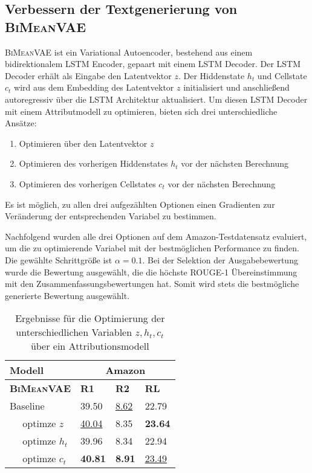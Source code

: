 \subsection{Verbessern der Textgenerierung von \textsc{BiMeanVAE}}
\textsc{BiMeanVAE} ist ein Variational Autoencoder, bestehend aus einem bidirektionalem LSTM Encoder, gepaart mit einem LSTM Decoder.
Der LSTM Decoder erhält als Eingabe den Latentvektor $z$. Der Hiddenstate $h_t$ und Cellstate $c_t$ wird aus dem Embedding des Latentvektor $z$ initialisiert und anschließend autoregressiv über die LSTM Architektur aktualisiert.
Um diesen LSTM Decoder mit einem Attributmodell zu optimieren, bieten sich drei unterschiedliche Ansätze:
\begin{enumerate}
    \item Optimieren über den Latentvektor $z$
    \item Optimieren des vorherigen Hiddenstates $h_t$ vor der nächsten Berechnung
    \item Optimieren des vorherigen Cellstates $c_t$ vor der nächsten Berechnung
\end{enumerate}

Es ist möglich, zu allen drei aufgezählten Optionen einen Gradienten zur Veränderung der entsprechenden Variabel zu bestimmen. 

Nachfolgend wurden alle drei Optionen auf dem Amazon-Testdatensatz evaluiert, um die zu optimierende Variabel mit der bestmöglichen Performance zu finden.
Die gewählte Schrittgröße ist $\alpha = 0.1$.
Bei der Selektion der Ausgabebewertung wurde die Bewertung ausgewählt, die die höchste ROUGE-1 Übereinstimmung mit den Zusammenfassungsbewertungen hat.
Somit wird stets die bestmögliche generierte Bewertung ausgewählt.

\begin{table}[h!]
    \centering
    \begin{tabular}{@{}llll@{}}
    \toprule
                    Modell   & \multicolumn{3}{c}{Amazon}              \\ \midrule
    \textbf{\textsc{BiMeanVAE}}    & \textbf{R1} & \textbf{R2} & \textbf{RL} \\ \midrule
    Baseline        & 39.50       & \underline{8.62}     &  22.79     \\
    $\quad$ optimze $z$        &   \underline{40.04}     &   8.35    &    \textbf{23.64}   \\
    $\quad$ optimze $h_t$      &  39.96   &    8.34  &  22.94  \\
    $\quad$ optimze $c_t$      &  \textbf{40.81}   &     \textbf{8.91}  &   \underline{23.49}    \\ \bottomrule
    \end{tabular}
    \caption{Ergebnisse für die Optimierung der unterschiedlichen Variablen $z,h_t,c_t$ über ein Attributionsmodell}
    \label{opt_bimeanvae}
\end{table}

